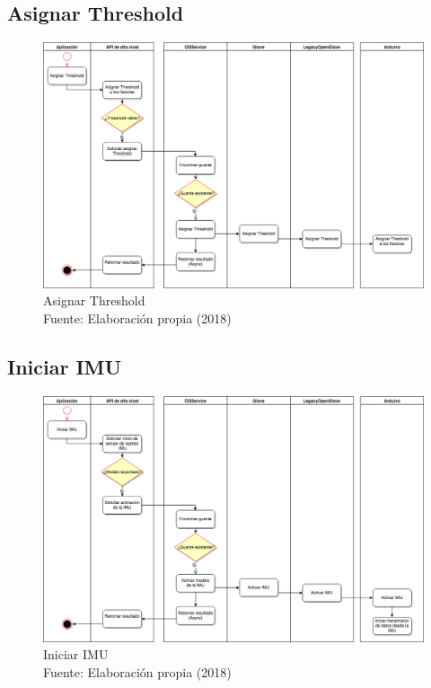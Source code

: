\subsection{Asignar Threshold}

\begin{figure}[H]
  \begin{center} 
   	\includegraphics[width=1.0\textwidth]{images/chapter04/ActivityDiagrams-AssignThreshold.png} 
    \caption[Asignar Threshold]{Asignar Threshold \\Fuente: Elaboración propia (2018)}
    \label{fig:activity-diagrams04-AssignThreshold}
  \end{center}
\end{figure}

\subsection{Iniciar IMU}

\begin{figure}[H]
  \begin{center} 
   	\includegraphics[width=1.0\textwidth]{images/chapter04/ActivityDiagrams-StartIMU.png} 
    \caption[Iniciar IMU]{Iniciar IMU \\Fuente: Elaboración propia (2018)}
    \label{fig:activity-diagrams05-StartIMU}
  \end{center}
\end{figure}

